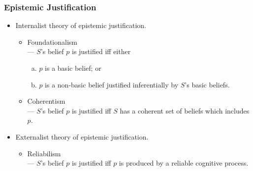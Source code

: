 \documentclass[UTF8,11pt,colorlinks,compress,openany]{beamer}%
\begin{document}
\begin{frame}\frametitle{Epistemic Justification}
\begin{figure}
\end{figure}
\begin{itemize}
\item Internalist theory of epistemic justification.
\begin{itemize}
	\item Foundationalism\\
	--- $S$'s belief $p$ is justified iff either
	\begin{enumerate}[(a)]
		\item $p$ is a basic belief; or
		\item $p$ is a non-basic belief justified inferentially by $S$'s basic beliefs.
	\end{enumerate}
	\item Coherentism\\
	--- $S$'s belief $p$ is justified iff $S$ has a coherent set of beliefs which includes $p$.
\end{itemize}
\item Externalist theory of epistemic justification.
\begin{itemize}
	\item Reliabilism\\
	--- $S$'s belief $p$ is justified iff $p$ is produced by a reliable cognitive process.
\end{itemize}
\end{itemize}
\end{frame}
\end{document}

